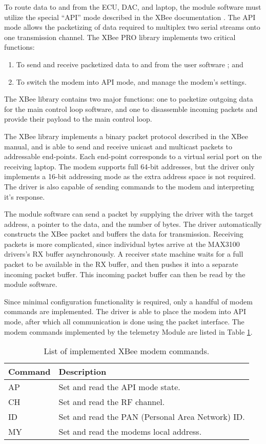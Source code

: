 To route data to and from the ECU, DAC, and laptop, the module software must utilize the special ``API'' mode described in the XBee documentation \cite{XBeeManual}. The API mode allows the packetizing of data required to multiplex two serial streams onto one transmission channel. The XBee PRO library implements two critical functions:

\begin{enumerate}
\item To send and receive packetized data to and from the user software ; and
\item To switch the modem into API mode, and manage the modem's settings.
\end{enumerate}

The XBee library contains two major functions: one to packetize outgoing data for the main control loop software, and one to disassemble incoming packets and provide their payload to the main control loop.

The XBee library implements a binary packet protocol described in the XBee manual, and is able to send and receive unicast and multicast packets to addressable end-points. Each end-point corresponds to a virtual serial port on the receiving laptop. The modem supports full 64-bit addresses, but the driver only implements a 16-bit addressing mode as the extra address space is not required. The driver is also capable of sending commands to the modem and interpreting it's response.

The module software can send a packet by supplying the driver with the target address, a pointer to the data, and the number of bytes. The driver automatically constructs the XBee packet and buffers the data for transmission. Receiving packets is more complicated, since individual bytes arrive at the MAX3100 drivers's RX buffer asynchronously. A receiver state machine waits for a full packet to be available in the RX buffer, and then pushes it into a separate incoming packet buffer. This incoming packet buffer can then be read by the module software.

Since minimal configuration functionality is required, only a handful of modem commands are implemented. The driver is able to place the modem into API mode, after which all communication is done using the packet interface. The modem commands implemented by the telemetry Module are listed in Table \ref{tab:xbee_commands}.

\begin{table}[H]
\caption{List of implemented XBee modem commands.}
\centering{}
\begin{tabular}{|l|l|}
\hline 
Command & Description \tabularnewline
\hline
\hline
AP & Set and read the API mode state. \tabularnewline
\hline
CH & Set and read the RF channel. \tabularnewline
\hline 
ID & Set and read the PAN (Personal Area Network) ID. \tabularnewline
\hline
MY & Set and read the modems local address. \tabularnewline
\hline
\end{tabular}
\label{tab:xbee_commands}
\end{table}

